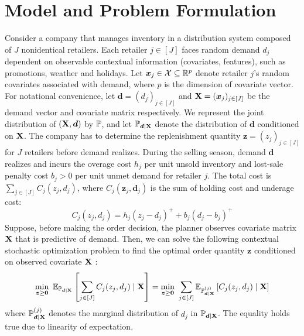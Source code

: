 \documentclass[mnsc, nonblindrev]{informswp}
\newcommand{\1}[1]{\mathds{1}{\left(#1\right)}}
\begin{document}
\section{Model and Problem Formulation}
Consider a company that manages inventory in a distribution system composed of $J$ nonidentical retailers. Each retailer $j \in [J]$ faces random demand ${d}_j$ dependent on observable contextual information (covariates, features), such as promotions, weather and holidays. Let ${\bm x}_j \in \mathcal{X} \subseteq \mathbb{R}^p$ denote retailer $j$'s random covariates associated with demand, where $p$ is the dimension of covariate vector. For notational convenience, let ${\bm d} = ({d}_j)_{j \in [J]}$ and ${{\mathbf{X}}} = ({\bm x}_j)_{j \in [J]}$ be the demand vector and covariate matrix respectively. We represent the joint distribution of $( {{\mathbf{X}}}, {\bm d})$ by $\mathbb{P}$, and let $\mathbb{P}_{\bm d \mid {\mathbf{X}}}$ denote the distribution of $\bm d$ conditioned on ${\mathbf{X}}$. The company has to determine the replenishment quantity $\bm z = (z_j)_{j \in [J]}$ for $J$ retailers before demand realizes.
During the selling season, demand $\bm d$ realizes and incurs the overage cost $h_j$ per unit unsold inventory and lost-sale penalty cost $b_j > 0$ per unit unmet demand for retailer $j$. The total cost is $\sum_{j \in [J]} C_j (z_j,  d_j)$, where $C_j (\bm z_j, \bm d_j)$ is the sum of holding cost and underage cost:
\[
 C_j (z_j,  d_j) =  h_j (z_j - d_j)^+ + b_j (d_j -b_j)^+ 
\]
Suppose, before making the order decision, the planner observes covariate matrix ${\mathbf{X}}$ that is predictive of demand. Then, we can solve the following contextual stochastic optimization problem to find the optimal order quantity $\bm z$ conditioned on observed covariate ${\mathbf{X}}$ \citep{Ban_Rudin_2019big}: 
\begin{align}
\min_{\bm z \geq \bm 0} \  \mathbb{E}_{\mathbb{P}_{\bm d \mid {\mathbf{X}}}} \left[\sum_{j \in [J]}   C_j (z_j,  d_j)  \mid {\mathbf{X}} \right] 
= \min_{\bm z \geq \bm 0} \ \sum_{j \in [J]} \mathbb{E}_{\mathbb{P}^{(j)}_{\bm d \mid {\mathbf{X}}}} \left[  C_j (z_j,  d_j)  \mid {\mathbf{X}} \right]
\label{problem: contextual stochastic optimization}
\end{align}
where $ {\mathbb{P}^{(j)}_{\bm d \mid {\mathbf{X}}}}$ denotes the marginal distribution of $d_j$ in $\mathbb{P}_{\bm d \mid {\mathbf{X}}}$. The equality holds true due to linearity of expectation.
\end{document}
